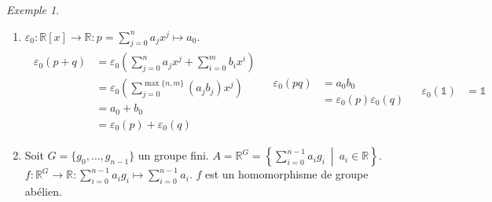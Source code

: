 \documentclass{report}
\theoremstyle{definition}
\theoremstyle{remark}
\newtheorem*{exem}{Exemple}
\def\ZZ{\mathbb{Z}}
\def\RR{\mathbb{R}}
\def\id{\mathds{1}}
\begin{document}
\begin{exem}
\begin{enumerate}
\begin{proof}[En effet,]
				De plus,
				\begin{align*}
					\begin{split}
						f(\overline{a}+\overline{b})&= f(\overline{a+b})\\
						&= \widetilde{a+b}\\
						&= \widetilde{a}+\widetilde{b}\\
						&= f(\overline{a})+f(\overline{b})
					\end{split}
					&
					\begin{split}
						f(\overline{a}\,\overline{b})&= f(\overline{ab})\\
						&= \widetilde{ab}\\
						&= \widetilde{a}\,\widetilde{b}\\
						&= f(\overline{a})f(\overline{b})
					\end{split}
					&
					\begin{split}
						f(\overline{\id})&= \widetilde{\id}\\
						&= \id+n\ZZ
					\end{split}
				\end{align*}
			\end{proof}
			\item $\varepsilon_0 : \RR[x]\to\RR : p=\sum_{j=0}^{n}a_jx^j\mapsto a_0$.
			\begin{align*}
				\begin{split}
					\varepsilon_0(p+q)&= \varepsilon_0\left(\sum_{j=0}^{n}a_jx^j+\sum_{i=0}^{m}b_ix^i\right)\\
					&= \varepsilon_0\left(\sum_{j=0}^{\max\{n,m\}}\left(a_jb_j\right)x^j\right)\\
					&= a_0+b_0\\
					&= \varepsilon_0(p)+\varepsilon_0(q)
				\end{split}
				&
				\begin{split}
					\varepsilon_0(pq)&= a_0b_0\\
					&= \varepsilon_0(p)\varepsilon_0(q)
				\end{split}
				&
				\begin{split}
					\varepsilon_0(\id)&= \id
				\end{split}
			\end{align*}
			\item Soit $G = \{g_0,\dots,g_{n-1}\}$ un groupe fini. $A=\RR^G = \left\{ \sum_{i=0}^{n-1}a_ig_i ~\middle|~ a_i\in\RR \right\}$. $f : \RR^G\to\RR : \sum_{i=0}^{n-1}a_ig_i \mapsto \sum_{i=0}^{n-1}a_i$. $f$ est un homomorphisme de groupe ab\'elien.


\end{enumerate}
\end{exem}
\end{document}
